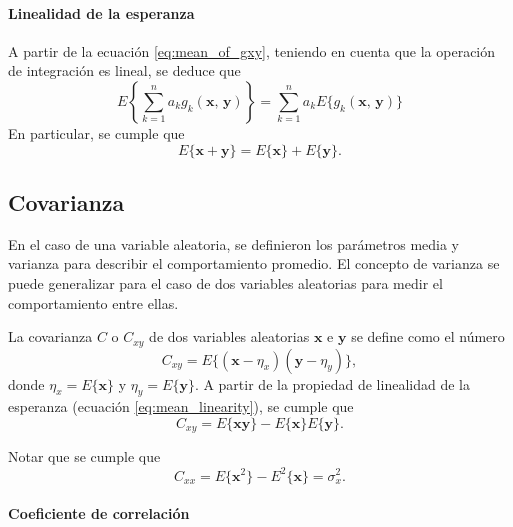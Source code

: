 \documentclass[a4paper]{report}
\newcommand{\x}{\mathbf{x}}
\newcommand{\y}{\mathbf{y}}
\begin{document}
\paragraph{Linealidad de la esperanza}

A partir de la ecuación \ref{eq:mean_of_gxy}, teniendo en cuenta que la operación de integración es lineal, se deduce que
\begin{equation}\label{eq:mean_linearity}
 E\left\{\sum_{k=1}^{n}a_kg_k(\x,\,\y)\right\}=\sum_{k=1}^{n}a_kE\{g_k(\x,\,\y)\}
\end{equation}
En particular, se cumple que
\[
 E\{\x+\y\}=E\{\x\}+E\{\y\}.
\]

\subsection{Covarianza}

En el caso de una variable aleatoria, se definieron los parámetros media y varianza para describir el comportamiento promedio. El concepto de varianza se puede generalizar para el caso de dos variables aleatorias para medir el comportamiento entre ellas.

La covarianza \(C\) o \(C_{xy}\) de dos variables aleatorias \(\x\) e \(\y\) se define como el número
\begin{equation}\label{eq:covariance_definition}
 C_{xy}=E\{(\x-\eta_x)(\y-\eta_y)\},
\end{equation}
donde \(\eta_x=E\{\x\}\) y \(\eta_y=E\{\y\}\). A partir de la propiedad de linealidad de la esperanza (ecuación \ref{eq:mean_linearity}), se cumple que
\[
 C_{xy}=E\{\x\y\}-E\{\x\}E\{\y\}.
\]

Notar que se cumple que
\[
 C_{xx}=E\{\x^2\}-E^2\{\x\}=\sigma_x^2.
\]

\paragraph{Coeficiente de correlación}
\end{document}
